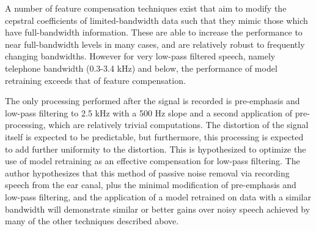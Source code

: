 A number of feature compensation techniques exist that aim to modify the cepstral coefficients of limited-bandwidth data such that they mimic those which have full-bandwidth information.  These are able to increase the performance to near full-bandwidth levels in many cases, and are relatively robust to frequently changing bandwidths.  However for very low-pass filtered speech, namely telephone bandwidth (0.3-3.4 kHz) and below, the performance of model retraining exceeds that of feature compensation.

The only processing performed after the signal is recorded is pre-emphasis and low-pass filtering to 2.5 kHz with a 500 Hz slope and a second application of pre-processing, which are relatively trivial computations. The distortion of the signal itself is expected to be predictable, but furthermore, this processing is expected to add further uniformity to the distortion.  This is hypothesized to optimize the use of model retraining as an effective compensation for low-pass filtering.  The author hypothesizes that this method of passive noise removal via recording speech from the ear canal, plus the minimal modification of pre-emphasis and low-pass filtering, and the application of a model retrained on data with a similar bandwidth will demonstrate similar or better gains over noisy speech achieved by many of the other techniques described above.


